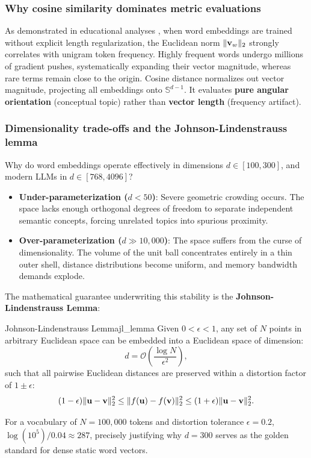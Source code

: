 \documentclass[../../../main.tex]{subfiles}
\begin{document}
\subsubsection{Why cosine similarity dominates metric evaluations}
As demonstrated in educational analyses \cite{enkk2023embeddings}, when word embeddings are trained without explicit length regularization, the Euclidean norm $\|\mathbf{v}_w\|_2$ strongly correlates with unigram token frequency. Highly frequent words undergo millions of gradient pushes, systematically expanding their vector magnitude, whereas rare terms remain close to the origin.
Cosine distance normalizes out vector magnitude, projecting all embeddings onto $\mathbb{S}^{d-1}$. It evaluates \textbf{pure angular orientation} (conceptual topic) rather than \textbf{vector length} (frequency artifact).

\subsubsection{Dimensionality trade-offs and the Johnson-Lindenstrauss lemma}
\label{subsec:johnson_lindenstrauss}

Why do word embeddings operate effectively in dimensions $d \in [100, 300]$, and modern LLMs in $d \in [768, 4096]$?
\begin{itemize}
    \item \textbf{Under-parameterization ($d < 50$)}: Severe geometric crowding occurs. The space lacks enough orthogonal degrees of freedom to separate independent semantic concepts, forcing unrelated topics into spurious proximity.
    \item \textbf{Over-parameterization ($d \gg 10{,}000$)}: The space suffers from the curse of dimensionality. The volume of the unit ball concentrates entirely in a thin outer shell, distance distributions become uniform, and memory bandwidth demands explode.
\end{itemize}

The mathematical guarantee underwriting this stability is the \textbf{Johnson-Lindenstrauss Lemma}:
\begin{theorem}{Johnson-Lindenstrauss Lemma}{jl_lemma}
Given $0 < \epsilon < 1$, any set of $N$ points in arbitrary Euclidean space can be embedded into a Euclidean space of dimension:
\begin{equation}
\label{eq:jl_dimension}
d = \mathcal{O}\left( \frac{\log N}{\epsilon^2} \right),
\end{equation}
such that all pairwise Euclidean distances are preserved within a distortion factor of $1 \pm \epsilon$:
\begin{equation}
\label{eq:jl_bound}
(1 - \epsilon) \|\mathbf{u} - \mathbf{v}\|_2^2 \le \|f(\mathbf{u}) - f(\mathbf{v})\|_2^2 \le (1 + \epsilon) \|\mathbf{u} - \mathbf{v}\|_2^2.
\end{equation}
\end{theorem}
For a vocabulary of $N = 100{,}000$ tokens and distortion tolerance $\epsilon = 0.2$, $\log(10^5) / 0.04 \approx 287$, precisely justifying why $d = 300$ serves as the golden standard for dense static word vectors.
\end{document}
